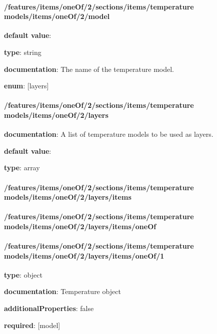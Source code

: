 \paragraph{/features/items/oneOf/2/sections/items/temperature models/items/oneOf/2/model} \begin{itemized}
\item {\bf default value}: 
\item {\bf type}: string
\item {\bf documentation}: The name of the temperature model.
\item {\bf enum}: [layers]\end{itemized}\paragraph{/features/items/oneOf/2/sections/items/temperature models/items/oneOf/2/layers} \begin{itemized}
\item {\bf documentation}: A list of temperature models to be used as layers.
\item {\bf default value}: 
\item {\bf type}: array
\paragraph{/features/items/oneOf/2/sections/items/temperature models/items/oneOf/2/layers/items} \begin{itemized}
\end{itemized}\end{itemized}\paragraph{/features/items/oneOf/2/sections/items/temperature models/items/oneOf/2/layers/items/oneOf} \begin{itemized}
\end{itemized}\paragraph{/features/items/oneOf/2/sections/items/temperature models/items/oneOf/2/layers/items/oneOf/1} \begin{itemized}
\item {\bf type}: object
\item {\bf documentation}: Temperature object
\item {\bf additionalProperties}: false
\item {\bf required}: [model]\end{itemized}
